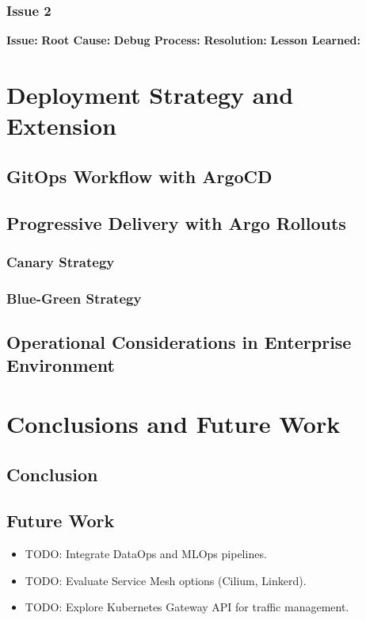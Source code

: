 \documentclass[12pt]{article}
\begin{document}
\subsubsection{Issue 2}
\textbf{Issue:} %
\textbf{Root Cause:} %
\textbf{Debug Process:} %
\textbf{Resolution:} %
\textbf{Lesson Learned:} %

\section{Deployment Strategy and Extension}
\subsection{GitOps Workflow with ArgoCD}

\subsection{Progressive Delivery with Argo Rollouts}
\subsubsection{Canary Strategy}
\subsubsection{Blue-Green Strategy}

\subsection{Operational Considerations in Enterprise Environment}

\section{Conclusions and Future Work}
\subsection{Conclusion}

\subsection{Future Work}
\begin{itemize}[leftmargin=1.5em]
    \item TODO: Integrate DataOps and MLOps pipelines.
    \item TODO: Evaluate Service Mesh options (Cilium, Linkerd).
    \item TODO: Explore Kubernetes Gateway API for traffic management.
\end{itemize}
\end{document}
